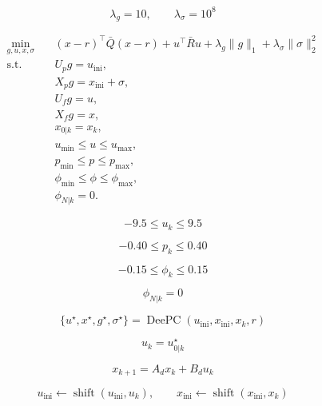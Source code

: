 \[
\lambda_g=10,
\qquad
\lambda_{\sigma}=10^8
\]


\[
\begin{aligned}
\min_{g,u,x,\sigma}\quad
&(x-r)^{\top}\bar Q(x-r)
+u^{\top}\bar R u
+\lambda_g\|g\|_1
+\lambda_{\sigma}\|\sigma\|_2^2\\
\mathrm{s.t.}\quad
&U_p g=u_{\mathrm{ini}},\\
&X_p g=x_{\mathrm{ini}}+\sigma,\\
&U_f g=u,\\
&X_f g=x,\\
&x_{0|k}=x_k,\\
&u_{\min}\le u\le u_{\max},\\
&p_{\min}\le p\le p_{\max},\\
&\phi_{\min}\le \phi\le \phi_{\max},\\
&\phi_{N|k}=0.
\end{aligned}
\]


\[
-9.5\le u_k\le 9.5
\]

\[
-0.40\le p_k\le 0.40
\]

\[
-0.15\le \phi_k\le 0.15
\]

\[
\phi_{N|k}=0
\]


\[
\{u^\star,x^\star,g^\star,\sigma^\star\}
=
\operatorname{DeePC}
\left(
u_{\mathrm{ini}},
x_{\mathrm{ini}},
x_k,
r
\right)
\]

\[
u_k=u^\star_{0|k}
\]

\[
x_{k+1}=A_d x_k+B_d u_k
\]

\[
u_{\mathrm{ini}}
\leftarrow
\operatorname{shift}
\left(u_{\mathrm{ini}},u_k\right),
\qquad
x_{\mathrm{ini}}
\leftarrow
\operatorname{shift}
\left(x_{\mathrm{ini}},x_k\right)
\]


